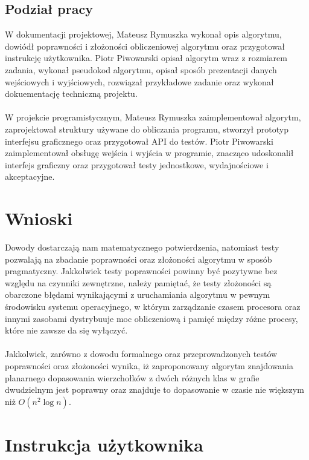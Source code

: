 \documentclass[10pt,a4paper]{article}
\begin{document}
	\subsection{Podział pracy}
	
	W dokumentacji projektowej, Mateusz Rymuszka wykonał opis algorytmu, dowiódł poprawności i złożoności obliczeniowej algorytmu oraz przygotował instrukcję użytkownika. Piotr Piwowarski opisał algorytm wraz z rozmiarem zadania, wykonał pseudokod algorytmu, opisał sposób prezentacji danych wejściowych i wyjściowych, rozwiązał przykładowe zadanie oraz wykonał dokuementację techniczną projektu.\\~\\
	W projekcie programistycznym, Mateusz Rymuszka zaimplementował algorytm, zaprojektował struktury używane do obliczania programu, stworzył prototyp interfejsu graficznego oraz przygotował API do testów. Piotr Piwowarski zaimplementował obsługę wejścia i wyjścia w programie, znacząco udoskonalił interfejs graficzny oraz przygotował testy jednostkowe, wydajnościowe i akceptacyjne.
	
	\section{Wnioski}
	
	Dowody dostarczają nam matematycznego potwierdzenia, natomiast testy pozwalają na zbadanie poprawności oraz złożoności algorytmu w sposób pragmatyczny. Jakkolwiek testy poprawności powinny być pozytywne bez względu na czynniki zewnętrzne, należy pamiętać, że testy złożoności są obarczone błędami wynikającymi z uruchamiania algorytmu w pewnym środowisku systemu operacyjnego, w którym zarządzanie czasem procesora oraz innymi zasobami dystrybuuje moc obliczeniową i pamięć między różne procesy, które nie zawsze da się wyłączyć.\\~\\
	Jakkolwiek, zarówno z dowodu formalnego oraz przeprowadzonych testów poprawności oraz złożoności wynika, iż zaproponowany algorytm znajdowania planarnego dopasowania wierzchołków z dwóch różnych klas w grafie dwudzielnym jest poprawny oraz znajduje to dopasowanie w czasie nie większym niż $O(n^{2} \log n)$. 
	
	\pagebreak
	
	\section{Instrukcja użytkownika}
	
\end{document}
